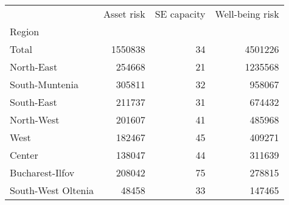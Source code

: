 \begin{tabular}{lrrr}
\toprule
{} &  Asset risk &  SE capacity &  Well-being risk \\
Region             &             &              &                  \\
\midrule
Total              &     1550838 &           34 &          4501226 \\
North-East         &      254668 &           21 &          1235568 \\
South-Muntenia     &      305811 &           32 &           958067 \\
South-East         &      211737 &           31 &           674432 \\
North-West         &      201607 &           41 &           485968 \\
West               &      182467 &           45 &           409271 \\
Center             &      138047 &           44 &           311639 \\
Bucharest-Ilfov    &      208042 &           75 &           278815 \\
South-West Oltenia &       48458 &           33 &           147465 \\
\bottomrule
\end{tabular}
